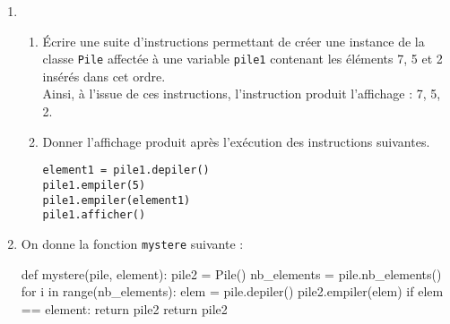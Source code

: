 \documentclass[a4paper,12pt,french]{book}
\begin{document}
    \begin{enumerate}[\bfseries 1.]
        \item
        \begin{enumerate}[\bfseries a.]
            \item 	Écrire une suite d’instructions permettant de créer une instance de la classe \texttt{Pile}
            affectée à une variable \texttt{pile1} contenant les éléments 7, 5 et 2 insérés dans cet
            ordre.\\
            Ainsi, à l’issue de ces instructions, l’instruction  produit
            l’affichage : 7, 5, 2.
            \item 	Donner l’affichage produit après l’exécution des instructions suivantes.
            \begin{verbatim}
element1 = pile1.depiler()
pile1.empiler(5)
pile1.empiler(element1)
pile1.afficher()
            \end{verbatim}
        \end{enumerate}
        \item On donne la fonction \texttt{mystere} suivante :
        \begin{pythoncode}
def mystere(pile, element):
    pile2 = Pile()
    nb_elements = pile.nb_elements()
    for i in range(nb_elements):
        elem = pile.depiler()
        pile2.empiler(elem)
        if elem == element:
            return pile2
    return pile2
        \end{pythoncode}


\end{enumerate}
\end{document}
